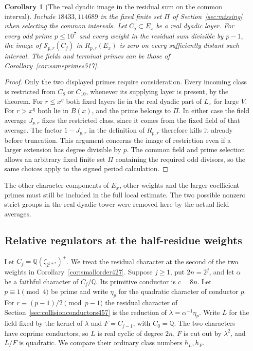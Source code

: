 \documentclass[a4paper,11pt]{article}
\newtheorem{corollary}[proposition]{Corollary}
\theoremstyle{definition}
\theoremstyle{remark}
\numberwithin{equation}{section}
\begin{document}
\begin{corollary}[The real dyadic image in the residual sum on the common interval]
\leavevmode\label{cor:actualdyadic525}
Include \(18433,114689\) in the fixed finite set \(\Pi\) of
Section~\ref{sec:missing} when selecting the common intervals. Let
\(C_j\subset E_x\) be a real dyadic layer. For every odd prime
\(p\le10^7\) and every weight in the residual sum divisible by
\(p-1\), the image of \(\mathcal S_{p,r}(C_j)\) in \(R_{p,r}(E_x)\)
is zero on every sufficiently distant such interval. The fields and
terminal primes can be those of Corollary~\ref{cor:sameprimes517}.
\end{corollary}
\begin{proof}
Only the two displayed primes require consideration. Every incoming
class is restricted from \(C_8\) or \(C_{10}\), whenever its supplying
layer is present, by the theorem. For \(r\le x^\eta\) both fixed
layers lie in the real dyadic part of \(L_x\) for large \(V\). For
\(r>x^\eta\) both lie in \(B(x)\), and the prime belongs to \(\Pi\).
In either case the field average \(J_{p,r}\) fixes the restricted
class, since it comes from the fixed field of that average. The
factor \(1-J_{p,r}\) in the definition of \(R_{p,r}\) therefore kills
it already before truncation. This argument concerns the image of
restriction even if a larger extension has degree divisible by \(p\).
The common field and prime selection allows an arbitrary fixed
finite set \(\Pi\) containing the required odd divisors, so the same
choices apply to the signed period calculation.
\end{proof}

The other character components of \(E_x\), other weights and the
larger coefficient primes must still be included in the full local
estimate. The two possible nonzero strict groups in the real dyadic
tower were removed here by the actual field averages.


\subsection{Relative regulators at the half-residue weights}
\label{sec:relativereg529}

Let \(C_j=\mathbb Q(\zeta_{2^{j+2}})^+\). We treat the residual
character at the second of the two weights in
Corollary~\ref{cor:smallorder427}. Suppose \(j\ge1\), put
\(2n=2^j\), and let \(\alpha\) be a faithful character of
\(C_j/\mathbb Q\). Its primitive conductor is \(c=8n\).
Let \(p\equiv1\pmod4\) be prime and write \(\eta_p\) for the
quadratic character of conductor \(p\). For
\(r\equiv(p-1)/2\pmod{p-1}\) the residual character of
Section~\ref{sec:collisionconductors457} is the reduction of
\(\lambda=\alpha^{-1}\eta_p\). Write \(L\) for the field fixed
by the kernel of \(\lambda\) and \(F=C_{j-1}\), with \(C_0=\mathbb Q\).
The two characters have coprime conductors, so \(L\) is real
cyclic of degree \(2n\), \(F\) is cut out by \(\lambda^2\), and
\(L/F\) is quadratic. We compare their ordinary class numbers
\(h_L,h_F\).
\end{document}
